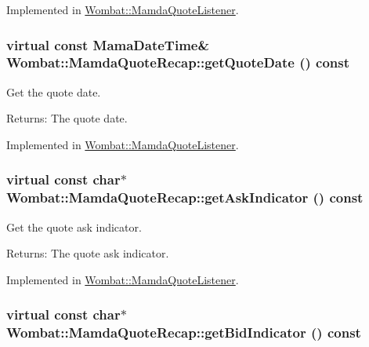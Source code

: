 Implemented in \hyperlink{classWombat_1_1MamdaQuoteListener_467043c393ad5906990c6c90c777e56b}{Wombat::Mamda\-Quote\-Listener}.\hypertarget{classWombat_1_1MamdaQuoteRecap_1400aa5f7ac60907d95f07fb3fd2192b}{
\subsubsection[getQuoteDate]{\setlength{\rightskip}{0pt plus 5cm}virtual const Mama\-Date\-Time\& Wombat::Mamda\-Quote\-Recap::get\-Quote\-Date () const}}
\label{classWombat_1_1MamdaQuoteRecap_1400aa5f7ac60907d95f07fb3fd2192b}


Get the quote date. 

\begin{Desc}
\item[Returns:]The quote date. \end{Desc}


Implemented in \hyperlink{classWombat_1_1MamdaQuoteListener_b7fa56da5969989fe36247d8e8d32f3f}{Wombat::Mamda\-Quote\-Listener}.\hypertarget{classWombat_1_1MamdaQuoteRecap_f2cd889d5838aa3204784eb57e447d4e}{
\subsubsection[getAskIndicator]{\setlength{\rightskip}{0pt plus 5cm}virtual const char$\ast$ Wombat::Mamda\-Quote\-Recap::get\-Ask\-Indicator () const}}
\label{classWombat_1_1MamdaQuoteRecap_f2cd889d5838aa3204784eb57e447d4e}


Get the quote ask indicator. 

\begin{Desc}
\item[Returns:]The quote ask indicator. \end{Desc}


Implemented in \hyperlink{classWombat_1_1MamdaQuoteListener_fac643c6fb9ad15e2d443d6a03304dfe}{Wombat::Mamda\-Quote\-Listener}.\hypertarget{classWombat_1_1MamdaQuoteRecap_91a0dbca4e481e0e3179af813128fba9}{
\subsubsection[getBidIndicator]{\setlength{\rightskip}{0pt plus 5cm}virtual const char$\ast$ Wombat::Mamda\-Quote\-Recap::get\-Bid\-Indicator () const}}
\label{classWombat_1_1MamdaQuoteRecap_91a0dbca4e481e0e3179af813128fba9}


